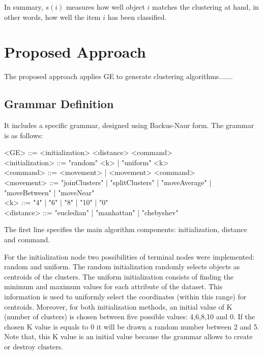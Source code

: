 \documentclass[conference,compsoc]{IEEEtran}
\begin{document}
In summary, $s(i)$ measures how well object $i$ matches the clustering at hand, in other words, how well the item $i$ has been classified.





\section{Proposed Approach} \label{sec:methodology}


The proposed approach applies GE to generate clustering algorithms.......


\subsection{ Grammar Definition}

It includes a specific grammar, designed  using  Backus-Naur form. The grammar is as follows:




\begin{grammar}
	<GE> ::= <initialization> <distance> <command> 
	\\ <initialization> ::= "random" <k> | "uniform" <k>
	\\ <command> ::= <movement> | <movement> <command>
	\\ <movement> ::= "joinClusters" | "splitClusters" | "moveAverage" | "moveBetween" | "moveNear" 
	\\ <k> ::= "4" | "6" | "8" | "10" | "0"
	\\ <distance> ::= "eucledian" | "manhattan" | "chebyshev"
	\label{ge-clustering-grammar}
\end{grammar}


The first line specifies the main algorithm components: initialization, distance and command. 

For the initialization node two possibilities of terminal nodes were implemented: random and uniform. The random initialization randomly selects  objects as centroids of the clusters. The uniform initialization consists of finding the minimum and maximum values for each attribute of the dataset. This information is used to uniformly select the coordinates (within this range) for centroids. Moreover, for both initialization methods, an initial value of K (number of clusters) is chosen between five possible values: 4,6,8,10 and 0. If the chosen K value is equals to 0 it will be drawn a random number between 2 and 5. Note that, this K value is an initial value because the grammar allows to create or destroy clusters. 
\end{document}
